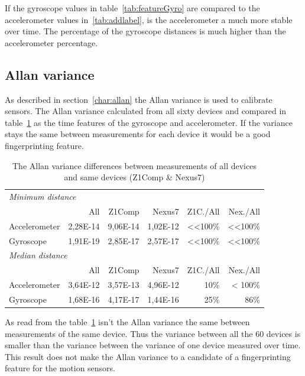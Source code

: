 If the gyroscope values in table~\ref{tab:featureGyro} are compared to the accelerometer values in~\ref{tab:addlabel}, is the accelerometer a much more stable over time. The percentage of the gyroscope distances is much higher than the accelerometer percentage.


\subsection{Allan variance}
As described in section~\ref{char:allan} the Allan variance is used to calibrate sensors. The Allan variance calculated from all sixty devices and compared in table~\ref{tab:allan} as the time features of the gyroscope and accelerometer. If the variance stays the same between measurements for each device it would be a good fingerprinting feature.\\
\begin{table}[htbp]
  \centering
    \begin{tabular}{lrrrrr}
    \toprule
    \multicolumn{6}{l}{\textit{Minimum distance}} \\
          & All   & Z1Comp & Nexus7 & Z1C./All & Nex./All \\
          \midrule
    Accelerometer & 2,28E-14 & 9,06E-14 & 1,02E-12 & <<100\% & <<100\% \\
    Gyroscope & 1,91E-19 & 2,85E-17 & 2,57E-17 & <<100\% & <<100\% \\
    \toprule
    \multicolumn{6}{l}{\textit{Median distance}} \\
          & All   & Z1Comp & Nexus7 & Z1C./All & Nex./All \\
          \midrule
    Accelerometer & 3,64E-12 & 3,57E-13 & 4,96E-12 & 10\%  & < 100\% \\
    Gyroscope & 1,68E-16 & 4,17E-17 & 1,44E-16 & 25\%  & 86\% \\
    \bottomrule
    \end{tabular}%
    \caption{The Allan variance differences between measurements of all devices and same devices (Z1Comp \& Nexus7)}
  \label{tab:allan}%
\end{table}%
As read from the table~\ref{tab:allan} isn't the Allan variance the same between measurements of the same device. Thus the variance between all the 60 devices is smaller than the variance between the variance of one device measured over time. This result does not make the Allan variance to a candidate of a fingerprinting feature for the motion sensors.  


